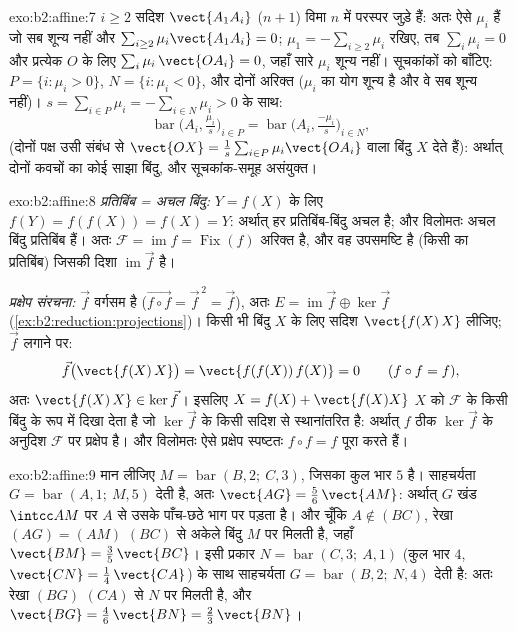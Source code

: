 \begin{solution}{exo:b2:affine:7}
$i \geq 2$ सदिश $\vect{A_1A_i}$ ($n + 1$) विमा $n$ में परस्पर जुड़े हैं: अतः ऐसे $\mu_i$ हैं जो सब
शून्य नहीं और $\sum_{i\geq2}
\mu_i\vect{A_1A_i} = 0$; $\mu_1 = -\sum_{i \geq 2}\mu_i$ रखिए, तब $\sum_{i}\mu_i = 0$ और प्रत्येक $O$ के लिए $\sum_i \mu_i\,\vect{OA_i} = 0$, जहाँ सारे
$\mu_i$ शून्य नहीं। सूचकांकों को बाँटिए: $P = \{i : \mu_i >
0\}$, $N = \{i : \mu_i < 0\}$, और दोनों अरिक्त ($\mu_i$ का
योग शून्य है और वे सब शून्य नहीं)। $s = \sum_{i\in P}\mu_i =
-\sum_{i \in N}\mu_i > 0$ के साथ:
\[
\operatorname{bar}\bigl(A_i, \tfrac{\mu_i}{s}\bigr)_{i \in P}
= \operatorname{bar}\bigl(A_i, \tfrac{-\mu_i}{s}\bigr)_{i \in N},
\]
(दोनों पक्ष उसी संबंध से $\vect{OX} = \frac1s\sum_{i\in
P}\mu_i\vect{OA_i}$ वाला बिंदु $X$ देते हैं): अर्थात् दोनों
 कवचों का कोई साझा बिंदु, और सूचकांक-समूह असंयुक्त।
\end{solution}

\begin{solution}{exo:b2:affine:8}
\emph{प्रतिबिंब = अचल बिंदु:} $Y = f(X)$ के लिए $f(Y) = f(f(X)) =
f(X) = Y$: अर्थात् हर प्रतिबिंब-बिंदु
अचल है; और विलोमतः अचल बिंदु प्रतिबिंब हैं। अतः $\mathcal{F} = \operatorname{im} f =
\operatorname{Fix}(f)$ अरिक्त है, और वह 
उपसमष्टि है (किसी  का प्रतिबिंब) जिसकी दिशा $\operatorname{im}\vec f$ है।

\emph{प्रक्षेप संरचना:} $\vec f$ वर्गसम है ($\vec{f\circ
f} = \vec f^{\,2} = \vec f$), अतः $E = \operatorname{im}\vec f
\oplus \ker \vec f$ (\cref{ex:b2:reduction:projections})। किसी भी बिंदु
$X$ के लिए सदिश $\vect{f(X)\,X}$ लीजिए; $\vec f$ लगाने पर:
\[
\vec f\bigl(\vect{f(X)\,X}\bigr) = \vect{f(f(X))\,f(X)} = 0
\qquad (f \circ f = f),
\]
अतः $\vect{f(X)\,X} \in \ker\vec f$। इसलिए $X = f(X) +
\vect{f(X)X}$ $X$ को $\mathcal{F}$ के किसी बिंदु के रूप में दिखा देता है जो
$\ker\vec f$ के किसी सदिश से स्थानांतरित है: अर्थात् $f$ ठीक $\ker\vec f$ के अनुदिश $\mathcal{F}$
पर प्रक्षेप है। और विलोमतः ऐसे प्रक्षेप स्पष्टतः $f \circ f = f$ पूरा करते हैं।
\end{solution}

\begin{solution}{exo:b2:affine:9}
मान लीजिए $M = \operatorname{bar}(B, 2;\ C, 3)$, जिसका कुल भार $5$ है। साहचर्यता $G = \operatorname{bar}(A, 1;\ M, 5)$ देती है, अतः $\vect{AG} = \frac56\,\vect{AM}$:
अर्थात् $G$ खंड $\intcc AM$ पर $A$ से उसके पाँच-छठे भाग पर पड़ता है। और चूँकि $A \notin
(BC)$,
रेखा $(AG) = (AM)$ $(BC)$ से अकेले बिंदु $M$ पर मिलती है, जहाँ $\vect{BM} = \frac35\,\vect{BC}$। इसी प्रकार $N =
\operatorname{bar}(C, 3;\ A, 1)$
(कुल भार $4$, $\vect{CN}
= \frac14\,\vect{CA}$) के साथ साहचर्यता $G =
\operatorname{bar}(B, 2;\ N, 4)$ देती है: अतः रेखा $(BG)$ $(CA)$ से
$N$ पर मिलती है, और $\vect{BG} = \frac46\,\vect{BN} =
\frac23\,\vect{BN}$।
\end{solution}

